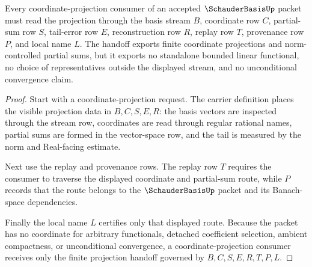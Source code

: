 \begin{theorem}
\label{thm:schauder-basis-coordinate-projection-handoff}
Every coordinate-projection consumer of an accepted $\SchauderBasisUp$ packet must read the projection through the basis stream $B$, coordinate row $C$, partial-sum row $S$, tail-error row $E$, reconstruction row $R$, replay row $T$, provenance row $P$, and local name $L$. The handoff exports finite coordinate projections and norm-controlled partial sums, but it exports no standalone bounded linear functional, no choice of representatives outside the displayed stream, and no unconditional convergence claim.
\end{theorem}
\begin{proof}
Start with a coordinate-projection request. The carrier definition places the visible projection data in $B,C,S,E,R$: the basis vectors are inspected through the stream row, coordinates are read through regular rational names, partial sums are formed in the vector-space row, and the tail is measured by the norm and Real-facing estimate.

Next use the replay and provenance rows. The replay row $T$ requires the consumer to traverse the displayed coordinate and partial-sum route, while $P$ records that the route belongs to the $\SchauderBasisUp$ packet and its Banach-space dependencies.

Finally the local name $L$ certifies only that displayed route. Because the packet has no coordinate for arbitrary functionals, detached coefficient selection, ambient compactness, or unconditional convergence, a coordinate-projection consumer receives only the finite projection handoff governed by $B,C,S,E,R,T,P,L$.
\end{proof}

